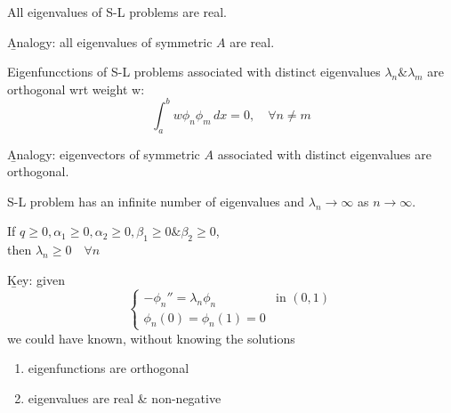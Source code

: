 \begin{theorem}
    All eigenvalues of S-L problems are real.
    
    \b{Analogy}: all eigenvalues of symmetric $A$ are real.
\end{theorem}
\begin{theorem}
    Eigenfuncctions of S-L problems associated with distinct eigenvalues $\lambda_n \& \lambda_m$ are orthogonal wrt weight w:
    \[\int_{a}^{b} w\phi_n \phi_m\, dx = 0, \quad \forall n\neq m\]

    \b{Analogy}: eigenvectors of symmetric $A$ associated with distinct eigenvalues are orthogonal.
\end{theorem}

\begin{theorem}
    S-L problem has an infinite number of eigenvalues and $\lambda_n \to \infty$ as $n\to \infty$.
\end{theorem}
\begin{theorem}
    If $q\geq 0, \alpha_1 \geq 0, \alpha_2 \geq 0, \beta_1 \geq 0 \& \beta_2 \geq 0$, 
    \\then $\lambda_n \geq 0 \quad \forall n$
\end{theorem}

\b{Key}: given 
\[\begin{cases*}
    -\phi_n '' = \lambda_n\phi_n \quad &\text{in }(0,1) \\
    \phi_n(0) = \phi_n(1) = 0 &
\end{cases*}\]
we could have known, without knowing the solutions
\begin{enumerate}[label = \roman*]
    \item eigenfunctions are orthogonal
    \item eigenvalues are real \& non-negative
\end{enumerate}

